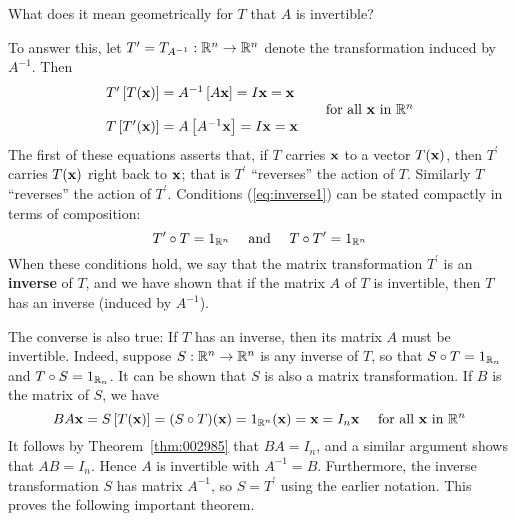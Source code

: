 \begin{center}
What does it mean geometrically for $T$ that $A$ is invertible?
\end{center}
To answer this, let $T^\prime = T_{A^{-1}} : \mathbb{R}^{n} \to \mathbb{R}^{n}$ denote the transformation induced by $A^{-1}$. Then
\begin{equation}\label{eq:inverse1}
\begin{array}{lll}
T^\prime \left[ T(\textbf{x}) \right] = A^{-1} \left[ A\textbf{x} \right] = I\textbf{x} = \textbf{x} & & \\
& & \mbox{for all } \textbf{x} \mbox{ in } \mathbb{R}^{n} \\
T \left[ T^\prime(\textbf{x}) \right] = A \left[ A^{-1}\textbf{x} \right] = I\textbf{x} = \textbf{x} & &
\end{array}
\end{equation} 
The first of these equations asserts that, if $T$ carries $\textbf{x}$ to a vector $T(\textbf{x})$, then $T^\prime$ carries $T(\textbf{x})$ right back to $\textbf{x}$; that is $T^\prime$ ``reverses'' the action of $T$. Similarly $T$ ``reverses'' the action of $T^\prime$. Conditions (\ref{eq:inverse1}) can be stated compactly in terms of composition:
\begin{equation}\label{eq:inverse2}
T^\prime \circ T = 1_{\mathbb{R}^{n}} \quad \mbox{ and } \quad T \circ T^\prime = 1_{\mathbb{R}^{n}}
\end{equation}
When these conditions hold, we say that the matrix transformation $T^\prime$ is an \textbf{inverse} of $T$, and we have shown that if the matrix $A$ of $T$ is invertible, then $T$ has an inverse (induced by $A^{-1}$).

The converse is also true: If $T$ has an inverse, then its matrix $A$ must be invertible. Indeed, suppose $S : \mathbb{R}^{n} \to \mathbb{R}^{n}$ is any inverse of $T$, so that $S \circ T = 1_{\mathbb{R}_{n}}$ and $T \circ S = 1_{\mathbb{R}_{n}}$. It can be shown that $S$ is also a matrix transformation. If $B$ is the matrix of $S$, we have
\begin{equation*}
BA\textbf{x} = S \left[ T(\textbf{x}) \right] = (S \circ T)(\textbf{x}) = 1_{\mathbb{R}^{n}}(\textbf{x}) = \textbf{x} = I_{n}\textbf{x} \quad \mbox{ for all } \textbf{x} \mbox{ in } \mathbb{R}^{n}
\end{equation*}
It follows by Theorem~\ref{thm:002985} that $BA = I_{n}$, and a similar argument shows that $AB = I_{n}$. Hence $A$ is invertible with $A^{-1} = B$. Furthermore, the inverse transformation $S$ has matrix $A^{-1}$, so $S = T^\prime$ using the earlier notation. This proves the following important theorem.


